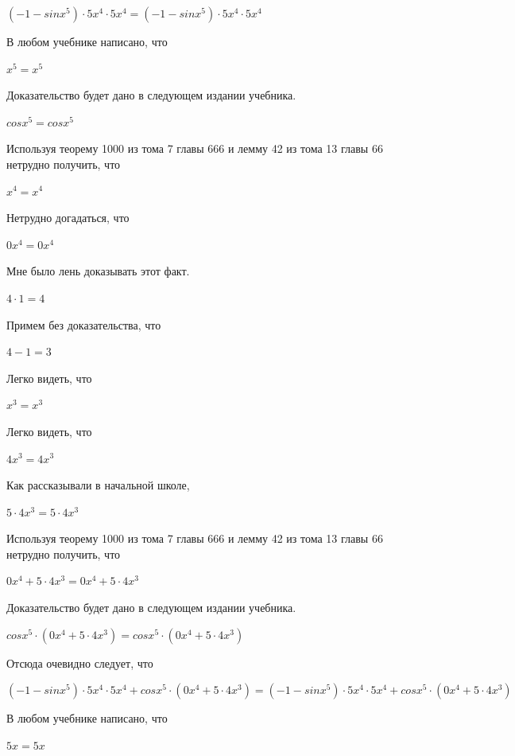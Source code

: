 \documentclass[12pt,a4paper,fleqn]{article}
\theoremstyle{definition}
\begin{document}
$( -1  - sin{ x }^{ 5 }) \cdot  5 { x }^{ 4 } \cdot  5 { x }^{ 4 } = ( -1  - sin{ x }^{ 5 }) \cdot  5 { x }^{ 4 } \cdot  5 { x }^{ 4 }$

В любом учебнике написано, что 

${ x }^{ 5 } = { x }^{ 5 }$

Доказательство будет дано в следующем издании учебника. 

$cos{ x }^{ 5 } = cos{ x }^{ 5 }$

Используя теорему 1000 из тома 7 главы 666 и лемму 42 из тома 13 главы 66 нетрудно получить, что 

${ x }^{ 4 } = { x }^{ 4 }$

Нетрудно догадаться, что 

$ 0 { x }^{ 4 } =  0 { x }^{ 4 }$

Мне было лень доказывать этот факт.

$ 4  \cdot  1  =  4 $

Примем без доказательства, что 

$ 4  -  1  =  3 $

Легко видеть, что 

${ x }^{ 3 } = { x }^{ 3 }$

Легко видеть, что 

$ 4 { x }^{ 3 } =  4 { x }^{ 3 }$

Как рассказывали в начальной школе, 

$ 5  \cdot  4 { x }^{ 3 } =  5  \cdot  4 { x }^{ 3 }$

Используя теорему 1000 из тома 7 главы 666 и лемму 42 из тома 13 главы 66 нетрудно получить, что 

$ 0 { x }^{ 4 } +  5  \cdot  4 { x }^{ 3 } =  0 { x }^{ 4 } +  5  \cdot  4 { x }^{ 3 }$

Доказательство будет дано в следующем издании учебника. 

$cos{ x }^{ 5 } \cdot ( 0 { x }^{ 4 } +  5  \cdot  4 { x }^{ 3 }) = cos{ x }^{ 5 } \cdot ( 0 { x }^{ 4 } +  5  \cdot  4 { x }^{ 3 })$

Отсюда очевидно следует, что 

$( -1  - sin{ x }^{ 5 }) \cdot  5 { x }^{ 4 } \cdot  5 { x }^{ 4 } + cos{ x }^{ 5 } \cdot ( 0 { x }^{ 4 } +  5  \cdot  4 { x }^{ 3 }) = ( -1  - sin{ x }^{ 5 }) \cdot  5 { x }^{ 4 } \cdot  5 { x }^{ 4 } + cos{ x }^{ 5 } \cdot ( 0 { x }^{ 4 } +  5  \cdot  4 { x }^{ 3 })$

В любом учебнике написано, что 

$ 5  x  =  5  x $
\end{document}
